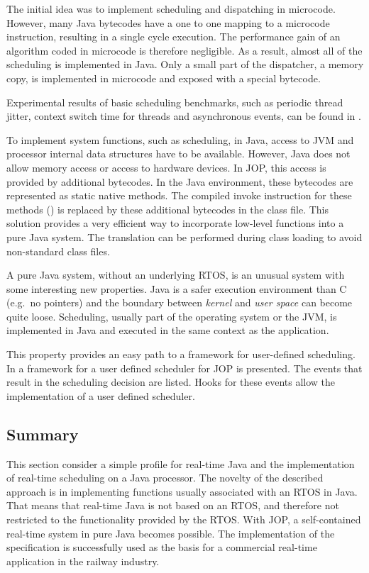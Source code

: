 The initial idea was to implement scheduling and dispatching in
microcode. However, many Java bytecodes have a one to one mapping to
a microcode instruction, resulting in a single cycle execution. The
performance gain of an algorithm coded in microcode is therefore
negligible. As a result, almost all of the scheduling is implemented
in Java. Only a small part of the dispatcher, a memory copy, is
implemented in microcode and exposed with a special bytecode.

Experimental results of basic scheduling benchmarks, such as periodic
thread jitter, context switch time for threads and asynchronous
events, can be found in \cite{jop:rtjava}.

To implement system functions, such as scheduling, in Java, access to
JVM and processor internal data structures have to be available.
However, Java does not allow memory access or access to hardware
devices. In JOP, this access is provided by additional bytecodes. In
the Java environment, these bytecodes are represented as static
native methods. The compiled invoke instruction for these methods
() is replaced by these additional bytecodes in
the class file. This solution provides a very efficient way to
incorporate low-level functions into a pure Java system. The
translation can be performed during class loading to avoid
non-standard class files.

A pure Java system, without an underlying RTOS, is an unusual system
with some interesting new properties. Java is a safer execution
environment than C (e.g.\ no pointers) and the boundary between
\emph{kernel} and \emph{user space} can become quite loose.
Scheduling, usually part of the operating system or the JVM, is
implemented in Java and executed in the same context as the
application.

This property provides an easy path to a framework for user-defined
scheduling. In \cite{jop:javasched} a framework for a user defined
scheduler for JOP is presented. The events that result in the
scheduling decision are listed. Hooks for these events allow the
implementation of a user defined scheduler.

\subsection{Summary}

This section consider a simple profile for real-time Java and the
implementation of real-time scheduling on a Java processor. The
novelty of the described approach is in implementing functions
usually associated with an RTOS in Java. That means that real-time
Java is not based on an RTOS, and therefore not restricted to the
functionality provided by the RTOS. With JOP, a self-contained
real-time system in pure Java becomes possible. The implementation of
the specification is successfully used as the basis for a commercial
real-time application in the railway industry.
